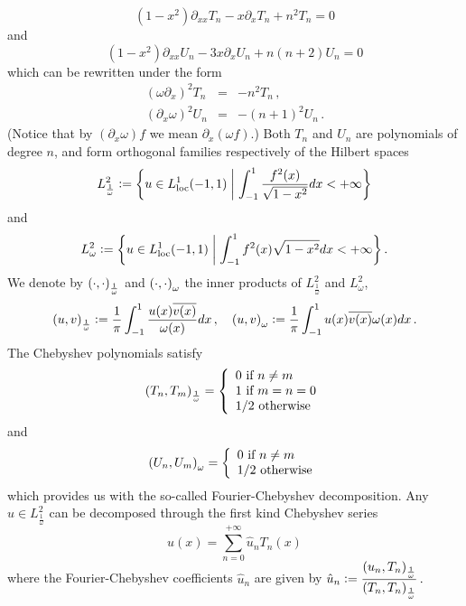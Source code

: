 \documentclass[a4paper]{article}
\begin{document}
$$
	(1-x^2)\partial_{xx}T_n -x\partial_x T_n +n^2T_n =0
$$
and
$$
(1-x^2)\partial_{xx}U_n -3x\partial_xU_n +n(n+2)U_n =0
$$
which can be rewritten under the form
\begin{eqnarray}
	(\omega\partial_x)^2 T_n &=& -n^2T_n\,, \label{cheb1}\\
	(\partial_x\omega)^2 U_n &=& -(n+1)^2U_n\, .\label{cheb2}
\end{eqnarray}
(Notice that by $(\partial_x\omega) f$ we mean $\partial_x(\omega f)$.) Both $T_n$ and $U_n$ are polynomials of degree $n$, and 
form orthogonal families respectively of the Hilbert spaces 
$$L^2_{\frac{1}{\omega}} \mathrel{\mathop:}= \left\{u \in L^1_\textup{loc}(-1,1)\mathrel{}\middle|\mathrel{}\int_{-1}^{1} \dfrac{f^2(x)}{\sqrt{1 - x^2} }dx< + \infty\right\}$$
and 
$$L^2_{\omega} \mathrel{\mathop:}= \left\{u \in L^1_\textup{loc}(-1,1)\mathrel{}\middle|\mathrel{}\int_{-1}^{1} {f^2(x)}{\sqrt{1 - x^2} }dx< + \infty\right\}.$$
We denote by $\left( \cdot,\cdot\right)_\frac{1}{\omega}$ and $\left( \cdot,\cdot\right)_\omega$ the inner products of $L^2_{\frac{1}{\omega}}$ and $L^2_{\omega}$,
\[\left( u,v\right)_{\frac{1}{\omega}} \mathrel{\mathop:}= \frac{1}{\pi}\int_{-1}^{1} \frac{u(x) \overline{v(x)}}{\omega(x)}dx\,, \quad \left( u,v\right)_{\omega} \mathrel{\mathop:}= \frac{1}{\pi}\int_{-1}^{1} {u(x) \overline{v(x)}}{\omega(x)}dx\,.\]
The Chebyshev polynomials satisfy
\begin{equation}
	\left( T_n,T_m\right)_\frac{1}{\omega} = \left\{
	\begin{array}{l}
	0 \mbox{ if } n\ne m\\
	1 \mbox{ if } m=n=0\\
	1/2 \mbox{ otherwise}
	\end{array} 
	\right.
\end{equation}
	and
\begin{equation}
	\left( U_n,U_m\right)_{\omega} = \left\{
	\begin{array}{l}
	0 \mbox{ if } n\ne m\\
	1/2 \mbox{ otherwise}
	\end{array} 
	\right.
\end{equation}
which provides us with the so-called Fourier-Chebyshev decomposition. Any
$u\in L^2_{\frac{1}{\omega}}$ can be decomposed through the first kind Chebyshev series 
\begin{equation}
	u(x) = \sum_{n=0}^{+\infty} \hat{u}_n T_n(x)
	\label{FCseries}
\end{equation}
where the Fourier-Chebyshev coefficients $\hat{u}_n$ are given by $\hat{u}_n \mathrel{\mathop:}= \dfrac{\left( u_n,T_n\right)_\frac{1}{\omega}}{\left( T_n,T_n\right)_\frac{1}{\omega}}\,.$
\end{document}

